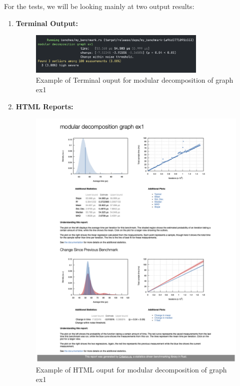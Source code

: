 \begin{myex}
    For the tests, we will be looking mainly at two output results:
    \begin{enumerate}
        \item \textbf{Terminal Output:}
                \begin{figure}[!h]
                    \centering
                    \includegraphics[width=0.80\textwidth]{images/benchmark/benchmark-terminal-output}
                    \caption{Example of Terminal ouput for modular decomposition of graph ex1}
                    \label{fig:example-of-terminal-output}
                \end{figure}
        \item \textbf{HTML Reports:}
                \begin{figure}[!h]
                    \centering
                    \includegraphics[width=1\textwidth]{images/benchmark/benchmark-html-output}
                    \caption{Example of HTML ouput for modular decomposition of graph ex1}
                    \label{fig:example-of-html-output}
                \end{figure}
    \end{enumerate}
\end{myex}


